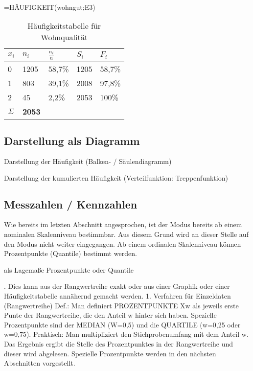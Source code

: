 =HÄUFIGKEIT(wohngut;E3)


\begin{table}[h]
\caption{Häufigkeitstabelle für Wohnqualität} \label{tab:excel_bsp}
\begin{center}
\begin{tabular}{p{1.25cm}p{1.25cm}p{1.25cm}p{1.25cm}p{1.25cm}}
\hline \hline
\textbf{$x_i$} & \textbf{$n_i$} & \textbf{$\frac{n_i}{n}$} & \textbf{$S_i$} & \textbf{$F_i$}\\ 
\hline
0 & 1205 & 58,7\% & 1205 & 58,7\% \\
1 & 803 & 39,1\% & 2008 & 97,8\% \\
2 & 45 & 2,2\% & 2053 & 100\% \\
\hline
$\Sigma$ & \textbf{2053}
\end{tabular}
\end{center}
\label{default}
\end{table}%




\subsection{Darstellung als Diagramm}
Darstellung der Häufigkeit (Balken- / Säulendiagramm)




 

Darstellung der kumulierten Häufigkeit (Verteilfunktion: Treppenfunktion)

\subsection{Messzahlen / Kennzahlen}
Wie bereits im letzten Abschnitt angesprochen, ist der Modus bereits ab einem nominalen Skalenniveau
bestimmbar. Aus diesem Grund wird an dieser Stelle auf den Modus nicht weiter eingegangen. Ab einem
ordinalen Skalenniveau können Prozentpunkte (Quantile) bestimmt werden.

 als Lagemaße Prozentpunkte oder Quantile 


. Dies kann aus der Rangwertreihe
exakt oder aus einer Graphik oder einer Häufigkeitstabelle annähernd gemacht
werden.
1. Verfahren für Einzeldaten (Rangwertreihe)
Def.: Man definiert PROZENTPUNKTE Xw als jeweils erste Punte der
Rangwertreihe, die den Anteil w hinter sich haben. Spezielle Prozentpunkte
sind der MEDIAN (W=0,5) und die QUARTILE (w=0,25 oder w=0,75).
Praktisch: Man multipliziert den Stichprobenumfang mit dem Anteil w. Das
Ergebnis ergibt die Stelle des Prozentpunktes in der Rangwertreihe und dieser
wird abgelesen. Spezielle Prozentpunkte werden in den nächsten Abschnitten
vorgestellt.


